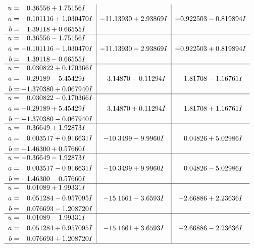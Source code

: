 \documentclass[1p]{elsarticle_modified}
\theoremstyle{definition}
\begin{document}
$$\begin{array}{c|c|c}
\begin{aligned}
u &= \phantom{-}0.36556 + 1.75156 I \\
a &= -0.101116 + 1.030470 I \\
b &= \phantom{-}1.39118 + 0.66555 I\end{aligned}
 & -11.13930 + 2.93869 I & -0.922503 - 0.819894 I \\ \hline\begin{aligned}
u &= \phantom{-}0.36556 - 1.75156 I \\
a &= -0.101116 - 1.030470 I \\
b &= \phantom{-}1.39118 - 0.66555 I\end{aligned}
 & -11.13930 - 2.93869 I & -0.922503 + 0.819894 I \\ \hline\begin{aligned}
u &= \phantom{-}0.030822 + 0.170366 I \\
a &= -0.29189 - 5.45429 I \\
b &= -1.370380 + 0.067940 I\end{aligned}
 & \phantom{-}3.14870 - 0.11294 I & \phantom{-}1.81708 - 1.16761 I \\ \hline\begin{aligned}
u &= \phantom{-}0.030822 - 0.170366 I \\
a &= -0.29189 + 5.45429 I \\
b &= -1.370380 - 0.067940 I\end{aligned}
 & \phantom{-}3.14870 + 0.11294 I & \phantom{-}1.81708 + 1.16761 I \\ \hline\begin{aligned}
u &= -0.36649 + 1.92873 I \\
a &= \phantom{-}0.003517 + 0.916631 I \\
b &= -1.46300 + 0.57660 I\end{aligned}
 & -10.3499 - 9.9960 I & \phantom{-}0.04826 + 5.02986 I \\ \hline\begin{aligned}
u &= -0.36649 - 1.92873 I \\
a &= \phantom{-}0.003517 - 0.916631 I \\
b &= -1.46300 - 0.57660 I\end{aligned}
 & -10.3499 + 9.9960 I & \phantom{-}0.04826 - 5.02986 I \\ \hline\begin{aligned}
u &= \phantom{-}0.01089 + 1.99331 I \\
a &= \phantom{-}0.051284 - 0.957095 I \\
b &= \phantom{-}0.076693 - 1.208720 I\end{aligned}
 & -15.1661 - 3.6593 I & -2.66886 + 2.23636 I \\ \hline\begin{aligned}
u &= \phantom{-}0.01089 - 1.99331 I \\
a &= \phantom{-}0.051284 + 0.957095 I \\
b &= \phantom{-}0.076693 + 1.208720 I\end{aligned}
 & -15.1661 + 3.6593 I & -2.66886 - 2.23636 I\\
 \hline 
 \end{array}$$\newpage\newpage\renewcommand{\arraystretch}{1}
\end{document}
